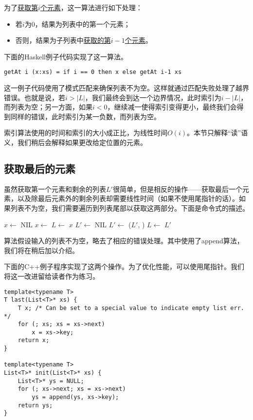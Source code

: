 \documentclass[UTF8]{article}
\begin{document}
为了\underline{获取第$i$个元素}，这一算法进行如下处理：
\begin{itemize}
\item 若$i$为0，结果为列表中的第一个元素；
\item 否则，结果为子列表中\underline{获取的第$i-1$个元素}。
\end{itemize}

下面的Haskell例子代码实现了这一算法。

\lstset{language=Haskell}
\begin{lstlisting}[style=Haskell]
getAt i (x:xs) = if i == 0 then x else getAt i-1 xs
\end{lstlisting}

这一例子代码使用了模式匹配来确保列表不为空。这样就通过匹配失败处理了越界错误。也就是说，若$i > |L|$，我们最终会到达一个边界情况，此时索引为$i - |L|$，而列表为空；另一方面，如果$i < 0$，继续减一使得索引变得更小，最终我们会得到同样的错误，此时索引为某一负数，而列表为空。

索引算法使用的时间和索引的大小成正比，为线性时间$O(i)$。本节只解释“读”语义，我们稍后会解释如果更改给定位置的元素。

\subsection{获取最后的元素}

虽然获取第一个元素和剩余的列表$L'$很简单，但是相反的操作——获取最后一个元素，以及除最后元素外的剩余列表却需要线性时间（如果不使用尾指针的话）。如果列表不为空，我们需要遍历到列表尾部以获取这两部分。下面是命令式的描述。

\begin{algorithmic}[1]
  \State $x \gets $ NIL
    \State $x \gets $ 
    \State $L \gets $ 
  \EndWhile
  \State \Return $x$
\EndFunction
\Statex
{}
  \State $L' \gets $ NIL
    \State $L' \gets$ ($L'$, )
    \State $L \gets $ 
  \EndWhile
  \State \Return $L'$
\EndFunction
\end{algorithmic}

算法假设输入的列表不为空，略去了相应的错误处理。其中使用了append算法，我们将在稍后加以介绍。

下面的C++例子程序实现了这两个操作。为了优化性能，可以使用尾指针。我们将这一改进留给读者作为练习。

\lstset{language=C++}
\begin{lstlisting}
template<typename T>
T last(List<T>* xs) {
    T x; /* Can be set to a special value to indicate empty list err. */
    for (; xs; xs = xs->next)
        x = xs->key;
    return x;
}

template<typename T>
List<T>* init(List<T>* xs) {
    List<T>* ys = NULL;
    for (; xs->next; xs = xs->next)
        ys = append(ys, xs->key);
    return ys;
}
\end{lstlisting}
\end{document}
